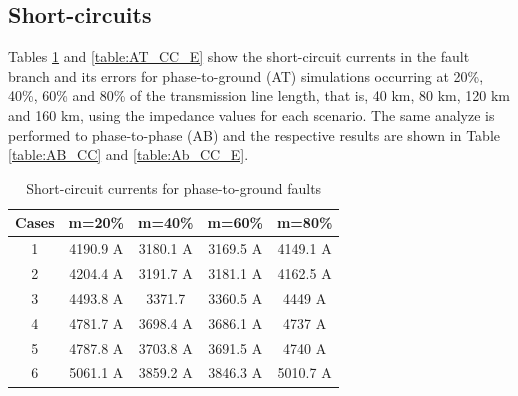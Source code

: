 \documentclass[conference]{IEEEtran}
\begin{document}
\subsection{Short-circuits}

Tables \ref{table:AT_CC} and \ref{table:AT_CC_E} show the short-circuit currents in the fault branch and its errors for phase-to-ground (AT) simulations occurring at 20\%, 40\%, 60\% and 80\% of the transmission line length, that is, 40 km, 80 km, 120 km and 160 km, using the impedance values for each scenario. The same analyze is performed to phase-to-phase (AB) and the respective results are shown in Table \ref{table:AB_CC} and \ref{table:Ab_CC_E}. 

\begin{table}[!hbt]
    \renewcommand{\arraystretch}{1.3}
	\caption{Short-circuit currents for phase-to-ground faults}
	\label{table:AT_CC}
	\centering
	\begin{tabular}{|c|c|c|c|c|}
		\hline
		\textbf{Cases} & \multicolumn{1}{l|}{\textbf{m=20\%}} & \multicolumn{1}{l|}{\textbf{m=40\%}} & \multicolumn{1}{l|}{\textbf{m=60\%}} & \multicolumn{1}{l|}{\textbf{m=80\%}} \\ \hline
		1              & 4190.9 A                              & 3180.1 A                              & 3169.5 A                              & 4149.1 A                              \\ \hline
		2              & 4204.4 A                              & 3191.7 A                              & 3181.1 A                              & 4162.5 A                              \\ \hline
		3              & 4493.8 A                              & 3371.7                                & 3360.5 A                              & 4449 A                                \\ \hline
		4              & 4781.7 A                              & 3698.4 A                              & 3686.1 A                              & 4737 A                                \\ \hline
		5              & 4787.8 A                              & 3703.8 A                              & 3691.5 A                              & 4740 A                                \\ \hline
		6              & 5061.1 A                              & 3859.2 A                              & 3846.3 A                              & 5010.7 A                              \\ \hline
	\end{tabular}
\end{table}
\end{document}
